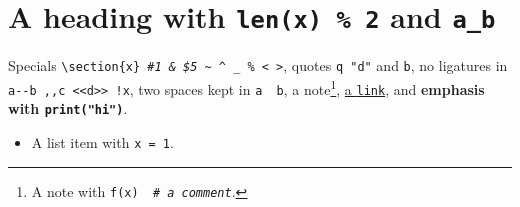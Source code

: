 \section{A heading with \texttt{\textcolor[HTML]{008000}{len}(x) \textcolor[HTML]{666666}{\%} \textcolor[HTML]{666666}{2}} and \texttt{a\_b}}

Specials \texttt{\textbackslash{}section\{x\} \textcolor[HTML]{3D7B7B}{\textit{\#1 \& \$5 \textasciitilde{} \textasciicircum{} \_ \% \textbar{} \textless{} \textgreater{}}}}, quotes \texttt{\textcolor[HTML]{BA2121}{\textquotesingle{}q\textquotesingle{}} \textcolor[HTML]{BA2121}{"d"}} and \texttt{\textasciigrave{}b\textasciigrave{}},
no ligatures in \texttt{a\textcolor[HTML]{666666}{-\/-}b ,\/,c \textcolor[HTML]{666666}{\textless{}\/\textless{}}d\textcolor[HTML]{666666}{\textgreater{}\/\textgreater{}} \textcolor[HTML]{666666}{!}x}, two spaces kept in \texttt{a \ b}, a note\footnote{A note with \texttt{f(x) \ \textcolor[HTML]{3D7B7B}{\textit{\# a comment}}}.},
\href{https://example.com}{a \texttt{link}}, and \textbf{emphasis with \texttt{\textcolor[HTML]{008000}{print}(\textcolor[HTML]{BA2121}{"hi"})}}.

\begin{itemize}
\item A list item with \texttt{x \textcolor[HTML]{666666}{=} \textcolor[HTML]{666666}{1}}.
\end{itemize}

